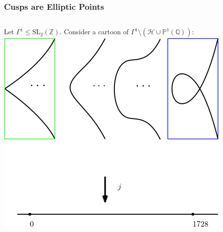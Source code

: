 \documentclass[handout]{beamer}
\numberwithin{equation}{section}
\numberwithin{case}{theorem}
\newcommand{\cH}{\mathcal{H}}		%
\newcommand{\bbP}{\mathbb{P}}		%
\newcommand{\bbQ}{\mathbb{Q}}		%
\newcommand{\bbZ}{\mathbb{Z}}		%
\newcommand{\SL}{\mathrm{SL}} 	%
\newcommand{\<}{\left\langle}
\renewcommand{\>}{\right\rangle}
\begin{document}
	\begin{frame}
		\frametitle{Cusps are Elliptic Points}
		\begin{columns} 
			\begin{column}{.5\textwidth}
				Let $\Gamma^1\leq \SL_2(\bbZ).$ Consider a cartoon of $\Gamma^1\setminus(\cH\cup\bbP^1(\bbQ))$:
				\includegraphics[scale=0.25]{ell.png}
				

\end{column}
\end{columns}
\end{frame}
\end{document}
